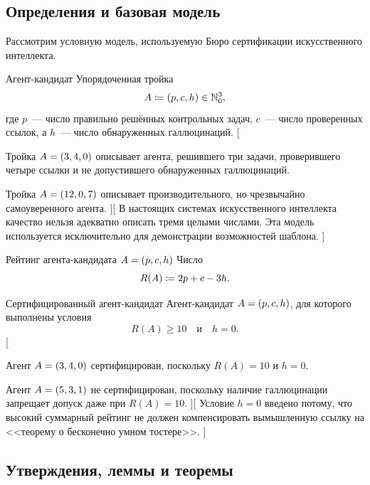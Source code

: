 \subsection{Определения и базовая модель}

Рассмотрим условную модель, используемую Бюро сертификации искусственного интеллекта.

{Агент-кандидат}{
    Упорядоченная тройка
    \begin{equation*}
        A \coloneqq \left(p, c, h\right) \in \mathbb{N}_0^3,
    \end{equation*}
    где $p$~--- число правильно решённых контрольных задач, $c$~--- число проверенных ссылок, а $h$~--- число обнаруженных галлюцинаций.
}[
    \item Тройка $A = \left(3, 4, 0\right)$ описывает агента, решившего три задачи, проверившего четыре ссылки и не допустившего обнаруженных галлюцинаций.
    \item Тройка $A = \left(12, 0, 7\right)$ описывает производительного, но чрезвычайно самоуверенного агента.
][
    В настоящих системах искусственного интеллекта качество нельзя адекватно описать тремя целыми числами.
    Эта модель используется исключительно для демонстрации возможностей шаблона.
]

{Рейтинг агента-кандидата $A = \left(p, c, h\right)$}{
    Число
    \begin{equation*}
        R(A) \coloneqq 2p + c - 3h.
    \end{equation*}
}

{Сертифицированный агент-кандидат}{
    Агент-кандидат $A = \left(p, c, h\right)$, для которого выполнены условия
    \begin{equation*}
        R(A) \ge 10
        \quad \text{и} \quad
        h = 0.
    \end{equation*}
}[
    \item Агент $A = \left(3, 4, 0\right)$ сертифицирован, поскольку $R(A) = 10$ и $h = 0$.
    \item Агент $A = \left(5, 3, 1\right)$ не сертифицирован, поскольку наличие галлюцинации запрещает допуск даже при $R(A) = 10$.
][
    Условие $h = 0$ введено потому, что высокий суммарный рейтинг не должен компенсировать вымышленную ссылку на <<теорему о бесконечно умном тостере>>.
]


\subsection{Утверждения, леммы и теоремы}

